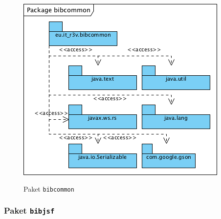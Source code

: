 \documentclass[fontsize=12pt,paper=a4,twoside]{scrartcl}
\begin{document}
\begin{figure} [H] 
\caption{Paket \texttt{bibcommon}} \centering
	\includegraphics[scale=2]{Diagramme/Packagebibcommon.png} 
	\label{pic:PackageCommon} 
\end{figure}


\newpage
\subsubsection{Paket \texttt{bibjsf}}
\label{sec:bibclient}
\end{document}
